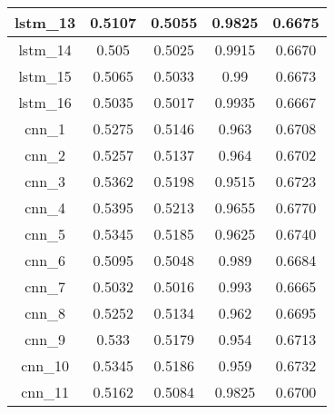 \begin{table}[]
\begin{tabular}{|c|c|c|c|c|}
        lstm\_13 & 0.5107                       & 0.5055      & 0.9825 & 0.6675 \\ \hline
        lstm\_14 & 0.505                        & 0.5025      & 0.9915 & 0.6670 \\ \hline
        lstm\_15 & 0.5065                       & 0.5033      & 0.99   & 0.6673 \\ \hline
        lstm\_16 & 0.5035                       & 0.5017      & 0.9935 & 0.6667 \\ \hline
        cnn\_1   & 0.5275                       & 0.5146      & 0.963  & 0.6708 \\ \hline
        cnn\_2   & 0.5257                       & 0.5137      & 0.964  & 0.6702 \\ \hline
        cnn\_3   & 0.5362                       & 0.5198      & 0.9515 & 0.6723 \\ \hline
        cnn\_4   & 0.5395                       & 0.5213      & 0.9655 & 0.6770 \\ \hline
        cnn\_5   & 0.5345                       & 0.5185      & 0.9625 & 0.6740 \\ \hline
        cnn\_6   & 0.5095                       & 0.5048      & 0.989  & 0.6684 \\ \hline
        cnn\_7   & 0.5032                       & 0.5016      & 0.993  & 0.6665 \\ \hline
        cnn\_8   & 0.5252                       & 0.5134      & 0.962  & 0.6695 \\ \hline
        cnn\_9   & 0.533                        & 0.5179      & 0.954  & 0.6713 \\ \hline
        cnn\_10  & 0.5345                       & 0.5186      & 0.959  & 0.6732 \\ \hline
        cnn\_11  & 0.5162                       & 0.5084      & 0.9825 & 0.6700 \\ \hline
    \end{tabular}
\end{table}


